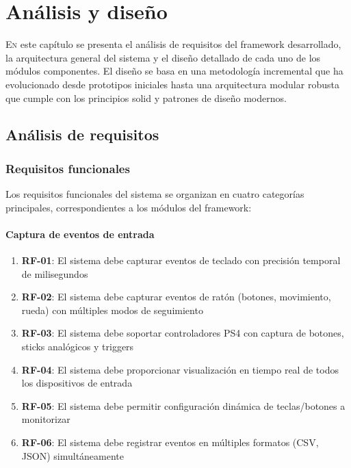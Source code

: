 \chapter{Análisis y diseño}
\label{chap:analisis_diseno}

\lettrine{E}{n} este capítulo se presenta el análisis de requisitos del framework desarrollado, la arquitectura general del sistema y el diseño detallado de cada uno de los módulos componentes. El diseño se basa en una metodología incremental que ha evolucionado desde prototipos iniciales hasta una arquitectura modular robusta que cumple con los principios \acrshort{solid} y patrones de diseño modernos.

\section{Análisis de requisitos}
\label{sec:analisis_requisitos}

\subsection{Requisitos funcionales}
\label{subsec:requisitos_funcionales}

Los requisitos funcionales del sistema se organizan en cuatro categorías principales, correspondientes a los módulos del framework:

\subsubsection{Captura de eventos de entrada}
\label{subsubsec:req_captura_entrada}

\begin{enumerate}
    \item \textbf{RF-01}: El sistema debe capturar eventos de teclado con precisión temporal de milisegundos
    \item \textbf{RF-02}: El sistema debe capturar eventos de ratón (botones, movimiento, rueda) con múltiples modos de seguimiento
    \item \textbf{RF-03}: El sistema debe soportar controladores PS4 con captura de botones, sticks analógicos y triggers
    \item \textbf{RF-04}: El sistema debe proporcionar visualización en tiempo real de todos los dispositivos de entrada
    \item \textbf{RF-05}: El sistema debe permitir configuración dinámica de teclas/botones a monitorizar
    \item \textbf{RF-06}: El sistema debe registrar eventos en múltiples formatos (CSV, JSON) simultáneamente
\end{enumerate}

